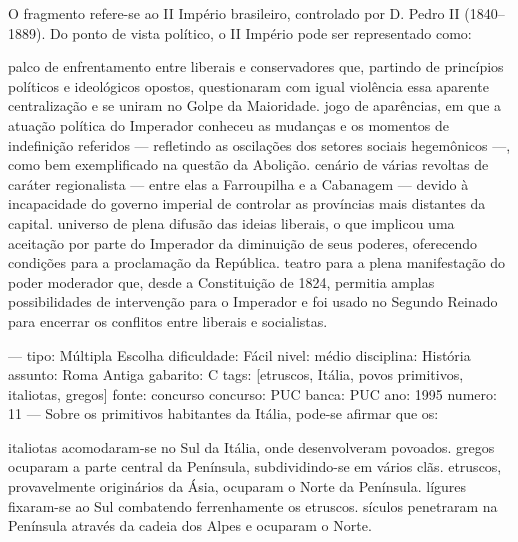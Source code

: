 O fragmento refere-se ao II Império brasileiro, controlado por D. Pedro II (1840--1889). Do ponto de vista político, o II Império pode ser representado como:
\begin{choices}
\choice palco de enfrentamento entre liberais e conservadores que, partindo de princípios políticos e ideológicos opostos, questionaram com igual violência essa aparente centralização e se uniram no Golpe da Maioridade.
\CorrectChoice jogo de aparências, em que a atuação política do Imperador conheceu as mudanças e os momentos de indefinição referidos --- refletindo as oscilações dos setores sociais hegemônicos ---, como bem exemplificado na questão da Abolição.
\choice cenário de várias revoltas de caráter regionalista --- entre elas a Farroupilha e a Cabanagem --- devido à incapacidade do governo imperial de controlar as províncias mais distantes da capital.
\choice universo de plena difusão das ideias liberais, o que implicou uma aceitação por parte do Imperador da diminuição de seus poderes, oferecendo condições para a proclamação da República.
\choice teatro para a plena manifestação do poder moderador que, desde a Constituição de 1824, permitia amplas possibilidades de intervenção para o Imperador e foi usado no Segundo Reinado para encerrar os conflitos entre liberais e socialistas.
\end{choices}

---
tipo: Múltipla Escolha
dificuldade: Fácil
nivel: médio
disciplina: História
assunto: Roma Antiga
gabarito: C
tags: [etruscos, Itália, povos primitivos, italiotas, gregos]
fonte: concurso
concurso: PUC
banca: PUC
ano: 1995
numero: 11
---
\question
Sobre os primitivos habitantes da Itália, pode-se afirmar que os:
\begin{choices}
\choice italiotas acomodaram-se no Sul da Itália, onde desenvolveram povoados.
\choice gregos ocuparam a parte central da Península, subdividindo-se em vários clãs.
\CorrectChoice etruscos, provavelmente originários da Ásia, ocuparam o Norte da Península.
\choice lígures fixaram-se ao Sul combatendo ferrenhamente os etruscos.
\choice sículos penetraram na Península através da cadeia dos Alpes e ocuparam o Norte.
\end{choices}

